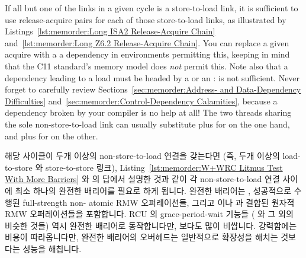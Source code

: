 If all but one of the links in a given cycle is a store-to-load
link, it is sufficient to use release-acquire pairs for each of
those store-to-load links, as illustrated by
Listings~\ref{lst:memorder:Long ISA2 Release-Acquire Chain}
and~\ref{lst:memorder:Long Z6.2 Release-Acquire Chain}.
You can replace a given acquire with a a dependency in environments permitting
this, keeping in mind that the C11 standard's memory model does \emph{not}
permit this.
Note also that a dependency leading to a load must be headed by
a  or an :
 is not sufficient.
Never forget to carefully review
Sections~\ref{sec:memorder:Address- and Data-Dependency Difficulties}
and~\ref{sec:memorder:Control-Dependency Calamities}, because
a dependency broken by your compiler is no help at all!
The two threads sharing the sole non-store-to-load link can
usually substitute  plus  for
 on the one hand,
and  plus  for 
on the other.
\fi

해당 사이클이 두개 이상의 non-store-to-load 연결을 갖는다면 (즉, 두개 이상의
load-to-store 와 store-to-store 링크),
Listing~\ref{lst:memorder:W+WRC Litmus Test With More Barriers} 와
\QuickQuizARef{\MemorderQQLitmusTestR} 의 답에서 설명한 것과 같이 각
non-store-to-load 연결 사이에 최소 하나의 완전한 배리어를 필요로 하게 됩니다.
완전한 배리어는 , 성공적으로 수행된 full-strength non-
atomic RMW 오퍼레이션들, 그리고  이나
 과 결합된 원자적 RMW 오퍼레이션들을 포함합니다.
RCU 의 grace-period-wait 기능들 ( 와 그 외의 비슷한 것들)
역시 완전한 배리어로 동작합니다만,  보다도 많이 비쌉니다.
강력함에는 비용이 따라옵니다만, 완전한 배리어의 오버헤드는 일반적으로 확장성을
해치는 것보다는 성능을 해칩니다.

